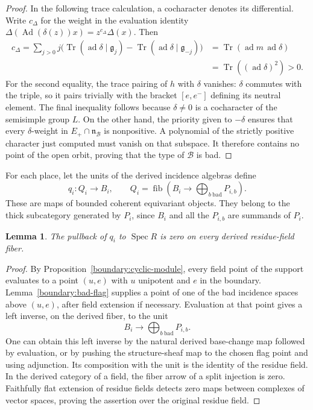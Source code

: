\documentclass[11pt]{article}
\numberwithin{equation}{section}
\newtheorem{lemma}[theorem]{Lemma}
\theoremstyle{definition}
\theoremstyle{remark}
\newcommand{\g}{\mathfrak g}
\newcommand{\Ad}{\operatorname{Ad}}
\newcommand{\ad}{\operatorname{ad}}
\newcommand{\Spec}{\operatorname{Spec}}
\newcommand{\Tr}{\operatorname{Tr}}
\newcommand{\fib}{\operatorname{fib}}
\begin{document}
\begin{proof}
In the following trace calculation, a cocharacter denotes its
differential.  Write $c_\Delta$ for the weight in the evaluation
identity $\Delta(\Ad(\delta(z))x)=z^{c_\Delta}\Delta(x)$.  Then
\begin{align*}
 c_\Delta=\sum_{j>0}j\bigl(\Tr(\ad\delta\mid\g_j)
                    -\Tr(\ad\delta\mid\g_{-j})\bigr)
 &=\Tr(\ad m\,\ad\delta)\\
 &=\Tr((\ad\delta)^2)>0.
\end{align*}
For the second equality, the trace pairing of $h$ with $\delta$ vanishes:
$\delta$ commutes with the triple, so it pairs trivially with the bracket
$[e,e^-]$ defining its neutral element.  The final inequality follows
because $\delta\ne0$ is a cocharacter of the semisimple group $L$.
On the other hand, the priority given to $-\delta$ ensures that every
$\delta$-weight in $E_+\cap\mathfrak n_{\mathcal B}$ is nonpositive.
A polynomial of the strictly positive character just computed must
vanish on that subspace.  It therefore contains no point of the open
orbit, proving that the type of $\mathcal B$ is bad.
\end{proof}

For each place, let the units of the derived incidence algebras define
\begin{equation}\label{eq:boundary-test}
 q_i:Q_i\longrightarrow B_i,
 \qquad
 Q_i=\fib\left(B_i\longrightarrow
              \bigoplus_{b\ \mathrm{bad}}P_{i,b}\right).
\end{equation}
These are maps of bounded coherent equivariant objects.  They belong
to the thick subcategory generated by $P_i$, since $B_i$ and all the
$P_{i,b}$ are summands of $P_i$.

\begin{lemma}\label{boundary:fiber-zero}
The pullback of $q_i$ to $\Spec R$ is zero on every derived residue-field
fiber.
\end{lemma}

\begin{proof}
By Proposition~\ref{boundary:cyclic-module}, every field point of the
support evaluates to a point $(u,e)$ with $u$ unipotent and $e$ in the
boundary.  Lemma~\ref{boundary:bad-flag} supplies a point of one of the
bad incidence spaces above $(u,e)$, after field extension if necessary.
Evaluation at that point gives a left inverse, on the derived fiber,
to the unit
\[
 B_i\longrightarrow\bigoplus_{b\ \mathrm{bad}}P_{i,b}.
\]
One can obtain this left inverse by the natural derived base-change map
followed by evaluation, or by pushing the structure-sheaf map to the
chosen flag point and using adjunction.  Its composition with the unit
is the identity of the residue field.  In the derived category of a
field, the fiber arrow of a split injection is zero.  Faithfully flat
extension of residue fields detects zero maps between complexes of
vector spaces, proving the assertion over the original residue field.
\end{proof}
\end{document}
